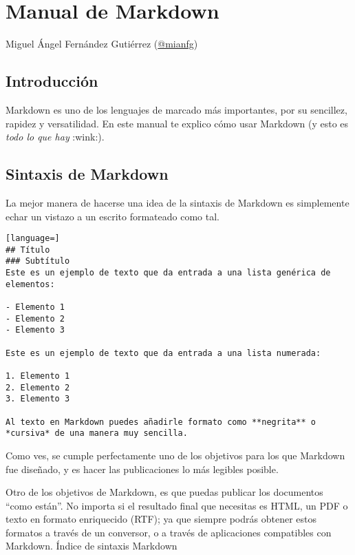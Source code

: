 %


\part{Manual de Markdown}

\begin{displayquote}
 Miguel Ángel Fernández Gutiérrez (\href{https://mianfg.bloomgogo.com}{@mianfg})
\end{displayquote}

\chapter{Introducción}

Markdown es uno de los lenguajes de marcado más importantes, por su sencillez, rapidez y versatilidad. En este manual te explico cómo usar Markdown (y esto es \emph{todo lo que hay} :wink:).

\chapter{Sintaxis de Markdown}

La mejor manera de hacerse una idea de la sintaxis de Markdown es simplemente echar un vistazo a un escrito formateado como tal.

\begin{lstlisting}[language=]
## Título
### Subtítulo
Este es un ejemplo de texto que da entrada a una lista genérica de elementos:

- Elemento 1
- Elemento 2
- Elemento 3

Este es un ejemplo de texto que da entrada a una lista numerada:

1. Elemento 1
2. Elemento 2
3. Elemento 3

Al texto en Markdown puedes añadirle formato como **negrita** o *cursiva* de una manera muy sencilla.
\end{lstlisting}

Como ves, se cumple perfectamente uno de los objetivos para los que Markdown fue diseñado, y es hacer las publicaciones lo más legibles posible.

Otro de los objetivos de Markdown, es que puedas publicar los documentos “como están”. No importa si el resultado final que necesitas es HTML, un PDF o texto en formato enriquecido (RTF); ya que siempre podrás obtener estos formatos a través de un conversor, o a través de aplicaciones compatibles con Markdown.
Índice de sintaxis Markdown

